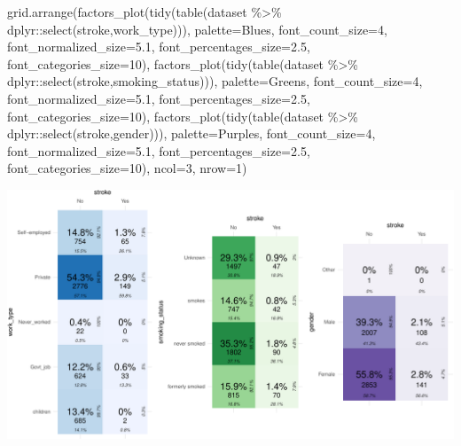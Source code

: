\documentclass[
]{article}
\newenvironment{Shaded}{\begin{snugshade}}{\end{snugshade}}
\newcommand{\AttributeTok}[1]{\textcolor[rgb]{0.77,0.63,0.00}{#1}}
\newcommand{\DecValTok}[1]{\textcolor[rgb]{0.00,0.00,0.81}{#1}}
\newcommand{\FloatTok}[1]{\textcolor[rgb]{0.00,0.00,0.81}{#1}}
\newcommand{\FunctionTok}[1]{\textcolor[rgb]{0.00,0.00,0.00}{#1}}
\newcommand{\NormalTok}[1]{#1}
\newcommand{\SpecialCharTok}[1]{\textcolor[rgb]{0.00,0.00,0.00}{#1}}
\newcommand{\StringTok}[1]{\textcolor[rgb]{0.31,0.60,0.02}{#1}}
\begin{document}
\begin{Shaded}
\begin{Highlighting}[]
\FunctionTok{grid.arrange}\NormalTok{(}\FunctionTok{factors\_plot}\NormalTok{(}\FunctionTok{tidy}\NormalTok{(}\FunctionTok{table}\NormalTok{(dataset }\SpecialCharTok{\%\textgreater{}\%}\NormalTok{ dplyr}\SpecialCharTok{::}\FunctionTok{select}\NormalTok{(stroke,work\_type))), }\AttributeTok{palette=}\StringTok{\textquotesingle{}Blues\textquotesingle{}}\NormalTok{,}
                         \AttributeTok{font\_count\_size=}\DecValTok{4}\NormalTok{, }\AttributeTok{font\_normalized\_size=}\FloatTok{5.1}\NormalTok{, }\AttributeTok{font\_percentages\_size=}\FloatTok{2.5}\NormalTok{,}
                         \AttributeTok{font\_categories\_size=}\DecValTok{10}\NormalTok{), }
            \FunctionTok{factors\_plot}\NormalTok{(}\FunctionTok{tidy}\NormalTok{(}\FunctionTok{table}\NormalTok{(dataset }\SpecialCharTok{\%\textgreater{}\%}\NormalTok{ dplyr}\SpecialCharTok{::}\FunctionTok{select}\NormalTok{(stroke,smoking\_status))), }\AttributeTok{palette=}\StringTok{\textquotesingle{}Greens\textquotesingle{}}\NormalTok{,}
                         \AttributeTok{font\_count\_size=}\DecValTok{4}\NormalTok{, }\AttributeTok{font\_normalized\_size=}\FloatTok{5.1}\NormalTok{, }\AttributeTok{font\_percentages\_size=}\FloatTok{2.5}\NormalTok{,}
                         \AttributeTok{font\_categories\_size=}\DecValTok{10}\NormalTok{),}
            \FunctionTok{factors\_plot}\NormalTok{(}\FunctionTok{tidy}\NormalTok{(}\FunctionTok{table}\NormalTok{(dataset }\SpecialCharTok{\%\textgreater{}\%}\NormalTok{ dplyr}\SpecialCharTok{::}\FunctionTok{select}\NormalTok{(stroke,gender))), }\AttributeTok{palette=}\StringTok{\textquotesingle{}Purples\textquotesingle{}}\NormalTok{,}
                         \AttributeTok{font\_count\_size=}\DecValTok{4}\NormalTok{, }\AttributeTok{font\_normalized\_size=}\FloatTok{5.1}\NormalTok{, }\AttributeTok{font\_percentages\_size=}\FloatTok{2.5}\NormalTok{,}
                         \AttributeTok{font\_categories\_size=}\DecValTok{10}\NormalTok{),}
            \AttributeTok{ncol=}\DecValTok{3}\NormalTok{, }\AttributeTok{nrow=}\DecValTok{1}\NormalTok{)}
\end{Highlighting}
\end{Shaded}

\begin{center}\includegraphics{report_files/figure-latex/unnamed-chunk-5-1} \end{center}
\end{document}
